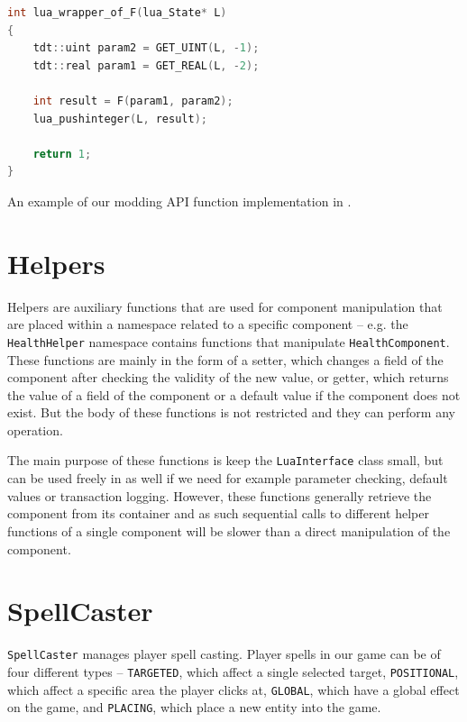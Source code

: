 \begin{listing}[H]
    \centering
    \begin{lstlisting}[language=C++]
int lua_wrapper_of_F(lua_State* L)
{
    tdt::uint param2 = GET_UINT(L, -1);
    tdt::real param1 = GET_REAL(L, -2);

    int result = F(param1, param2);
    lua_pushinteger(L, result);

    return 1;
}
    \end{lstlisting}
    \caption{An example of our modding API function implementation in \protect\cpp.}
    \label{lua-api-ex}
\end{listing}

\section{Helpers}

Helpers are auxiliary functions that are used for component manipulation that are placed within a namespace related to a specific component
-- e.g. the \texttt{HealthHelper} namespace contains functions that manipulate \texttt{HealthComponent}. These functions are mainly in the
form of a setter, which changes a field of the component after checking the validity of the new value, or getter, which returns the value
of a field of the component or a default value if the component does not exist. But the body of these functions is not restricted and they
can perform any operation.

The main purpose of these functions is keep the \texttt{LuaInterface} class small, but can be used freely in \cpp as well if we need for
example parameter checking, default values or transaction logging. However, these functions generally retrieve the component from its
container and as such sequential calls to different helper functions of a single component will be slower than a direct manipulation
of the component.

\section{SpellCaster}

\texttt{SpellCaster} manages player spell casting. Player spells in our game can be of four different types -- \texttt{TARGETED}, which
affect a single selected target, \texttt{POSITIONAL}, which affect a specific area the player clicks at, \texttt{GLOBAL}, which have a
global effect on the game, and \texttt{PLACING}, which place a new entity into the game.

